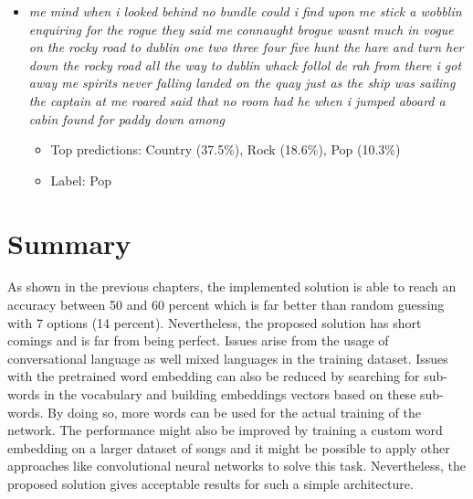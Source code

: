 \documentclass[12pt]{article}
\begin{document}
\begin{itemize}
	\item \textit{me mind when i looked behind no bundle could i find upon me stick a wobblin enquiring for the rogue they said me connaught brogue wasnt much in vogue on the rocky road to dublin one two three four five hunt the hare and turn her down the rocky road all the way to dublin whack follol de rah from there i got away me spirits never falling landed on the quay just as the ship was sailing the captain at me roared said that no room had he when i jumped aboard a cabin found for paddy down among}
	\begin{itemize}
		\item Top  predictions: Country (37.5\%), Rock (18.6\%), Pop (10.3\%)
		\item Label: Pop
	\end{itemize}
\end{itemize}


\section{Summary}

As shown in the previous chapters, the implemented solution is able to reach an accuracy between 50 and 60 percent which is far better than random guessing with 7 options (14 percent). Nevertheless, the proposed solution has short comings and is far from being perfect. Issues arise from the usage of conversational language as well mixed languages in the training dataset. Issues with the pretrained word embedding can also be reduced by searching for sub-words in the vocabulary and building embeddings vectors based on these sub-words. By doing so, more words can be used for the actual training of the network.
The performance might also be improved by training a custom word embedding on a larger dataset of songs and it might be possible to apply other approaches like convolutional neural networks to solve this task. Nevertheless, the proposed solution gives acceptable results for such a simple architecture.



\end{document}
